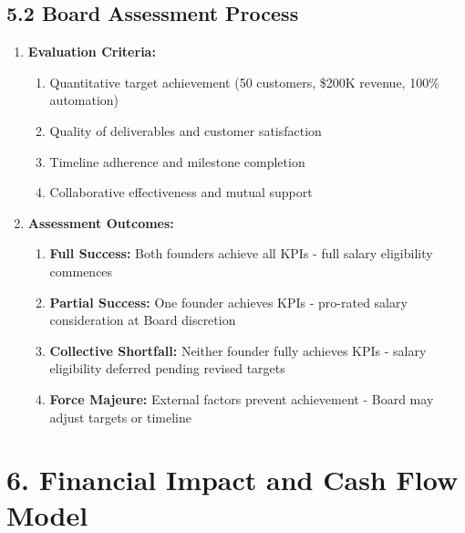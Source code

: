 \subsection*{5.2 Board Assessment Process}
\begin{enumerate}[label=\arabic*.]
\item \textbf{Evaluation Criteria:}
    \begin{enumerate}[label=(\alph*)]
    \item Quantitative target achievement (50 customers, \$200K revenue, 100\% automation)
    \item Quality of deliverables and customer satisfaction
    \item Timeline adherence and milestone completion
    \item Collaborative effectiveness and mutual support
    \end{enumerate}

\item \textbf{Assessment Outcomes:}
    \begin{enumerate}[label=(\alph*)]
    \item \textbf{Full Success:} Both founders achieve all KPIs - full salary eligibility commences
    \item \textbf{Partial Success:} One founder achieves KPIs - pro-rated salary consideration at Board discretion
    \item \textbf{Collective Shortfall:} Neither founder fully achieves KPIs - salary eligibility deferred pending revised targets
    \item \textbf{Force Majeure:} External factors prevent achievement - Board may adjust targets or timeline
    \end{enumerate}
\end{enumerate}

\section*{6. Financial Impact and Cash Flow Model}

